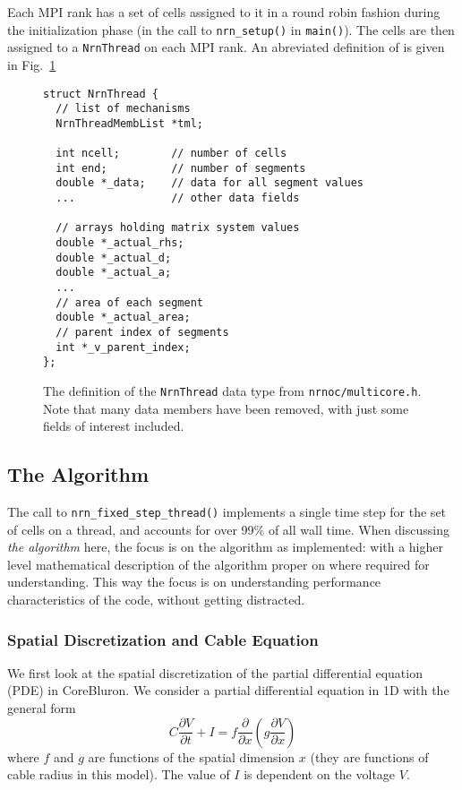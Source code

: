 \documentclass[11pt,a4paper]{article}
\newcommand{\lst}[1]{\lstinline!#1!} %
\newcommand{\fig}[1]{Fig.~\ref{#1}} %
\newcommand{\file}[1]{\lstinline[basicstyle=\normalsize,]!#1!} %
\newcommand{\pder}[2]{\frac{\partial{#1}}{\partial{#2}}} %
\newcommand{\neuron}{CoreBluron} %
\begin{document}
Each MPI rank has a set of cells assigned to it in a round robin fashion during the initialization phase (in the call to \lst{nrn_setup()} in \lst{main()}). The cells are then assigned to a \lst{NrnThread} on each MPI rank. An abreviated definition of is given in \fig{lst:NrnThread}
\begin{figure}
\begin{lstlisting}
struct NrnThread {
  // list of mechanisms
  NrnThreadMembList *tml;

  int ncell;        // number of cells
  int end;          // number of segments
  double *_data;    // data for all segment values
  ...               // other data fields

  // arrays holding matrix system values
  double *_actual_rhs;
  double *_actual_d;
  double *_actual_a;
  ...
  // area of each segment
  double *_actual_area;
  // parent index of segments
  int *_v_parent_index;
};
\end{lstlisting}
\label{lst:NrnThread}
\caption{The definition of the \lst{NrnThread} data type from \file{nrnoc/multicore.h}. Note that many data members have been removed, with just some fields of interest included.}
\end{figure}

\subsection{The Algorithm}
The call to \lst{nrn_fixed_step_thread()} implements a single time step for the set of cells on a thread, and accounts for over 99\% of all wall time. When discussing \emph{the algorithm} here, the focus is on the algorithm as implemented: with a higher level mathematical description of the algorithm proper on where required for understanding. This way the focus is on understanding performance characteristics of the code, without getting distracted.

\subsubsection{Spatial Discretization and Cable Equation}
We first look at the spatial discretization of the partial differential equation (PDE) in \neuron. We consider a partial differential equation in 1D with the general form
\begin{equation}
     C\pder{V}{t} + I = f \pder{}{x} \left( g\pder{V}{x} \right)
\end{equation}
where $f$ and $g$ are functions of the spatial dimension $x$ (they are functions of cable radius in this model). The value of $I$ is dependent on the voltage $V$.
\end{document}
